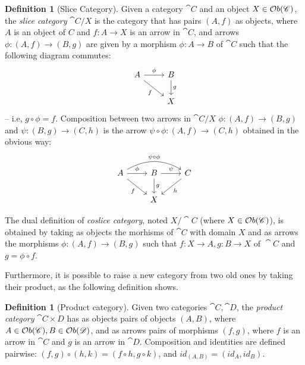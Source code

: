 \documentclass[a4paper, twoside,openright]{report}
\theoremstyle{plain}
\theoremstyle{definition}
\newtheorem{definition}[theorem]{Definition}
\begin{document}
\begin{definition}[Slice Category]\label{def:slice_cat}
    Given a category $\cat{C}$ and an object $X \in \mathcal{O}b(\mathscr{C})$, the \emph{slice category} $\cat{C}/X$ is the category that has pairs $(A, f)$ as objects, where $A$ is an object of $C$ and $f: A \rightarrow X$ is an arrow in $\cat{C}$, and arrows $\phi: (A, f) \rightarrow (B, g)$ are given by a morphism $\phi: A \rightarrow B$ of $\cat{C}$ such that the following diagram commutes:
    \[
        \begin{tikzcd}
            A \arrow[r, "{\phi}"] \arrow[dr, "f" swap] & B \arrow[d, "g"] \\
            & X
        \end{tikzcd}
    \]
    -- i.e, $g \circ \phi = f$.
    Composition between two arrows in $\cat{C}/X$ $\phi: (A, f) \rightarrow (B, g)$ and $\psi: (B, g) \rightarrow (C, h)$ is the arrow $\psi \circ \phi : (A, f) \rightarrow (C, h)$ obtained in the obvious way:
    \[
        \begin{tikzcd}
            A \arrow[bend left=30]{rr}{\psi \circ \phi}  \arrow[r, "{\phi}"] \arrow[dr, "f" swap] & B \arrow[r, "{\psi}"] \arrow[d, "g"] & C \arrow[dl, "h"] \\
            & X & 
        \end{tikzcd}
    \]

    The dual definition of \emph{coslice category}, noted $X/\cat{C}$ (where $X \in \mathcal{O}b(\mathscr{C})$), is obtained by taking as objects the morhisms of $\cat{C}$ with domain $X$ and as arrows the morphisms $\phi: (A, f) \rightarrow (B, g)$ such that $f:X\rightarrow A, g:B \rightarrow X \text{ of }\cat{C}$ and $g = \phi \circ f$. 
\end{definition}

Furthermore, it is possible to raise a new category from two old ones by taking their product, as the following definition shows.

\begin{definition}[Product category]
    Given two categories $\cat C, \cat D$, the \emph{product category} $\cat{C\times D}$ has as objects pairs of objects $(A, B)$, where $A \in \mathcal{O}b(\mathscr{C}), B \in \mathcal{O}b(\mathscr{D})$, and as arrows pairs of morphisms $(f, g)$, where $f$ is an arrow in $\cat C$ and $g$ is an arrow in $\cat D$. Composition and identities are defined pairwise: $(f, g) \circ (h, k) = (f \circ h, g \circ k)$, and $id_{(A, B)} = (id_A, id_B)$.

\end{definition}
\end{document}
